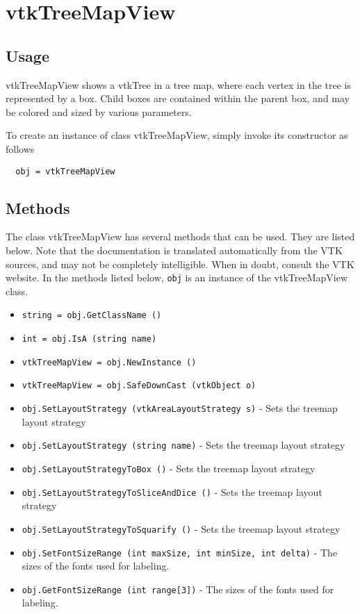 \section{vtkTreeMapView}

\subsection{Usage}

 vtkTreeMapView shows a vtkTree in a tree map, where each vertex in the
 tree is represented by a box.  Child boxes are contained within the
 parent box, and may be colored and sized by various parameters.

To create an instance of class vtkTreeMapView, simply
invoke its constructor as follows
\begin{verbatim}
  obj = vtkTreeMapView
\end{verbatim}
\subsection{Methods}

The class vtkTreeMapView has several methods that can be used.
  They are listed below.
Note that the documentation is translated automatically from the VTK sources,
and may not be completely intelligible.  When in doubt, consult the VTK website.
In the methods listed below, \verb|obj| is an instance of the vtkTreeMapView class.
\begin{itemize}
\item  \verb|string = obj.GetClassName ()|

\item  \verb|int = obj.IsA (string name)|

\item  \verb|vtkTreeMapView = obj.NewInstance ()|

\item  \verb|vtkTreeMapView = obj.SafeDownCast (vtkObject o)|

\item  \verb|obj.SetLayoutStrategy (vtkAreaLayoutStrategy s)| -  Sets the treemap layout strategy

\item  \verb|obj.SetLayoutStrategy (string name)| -  Sets the treemap layout strategy

\item  \verb|obj.SetLayoutStrategyToBox ()| -  Sets the treemap layout strategy

\item  \verb|obj.SetLayoutStrategyToSliceAndDice ()| -  Sets the treemap layout strategy

\item  \verb|obj.SetLayoutStrategyToSquarify ()| -  Sets the treemap layout strategy

\item  \verb|obj.SetFontSizeRange (int maxSize, int minSize, int delta)| -  The sizes of the fonts used for labeling.

\item  \verb|obj.GetFontSizeRange (int range[3])| -  The sizes of the fonts used for labeling.

\end{itemize}
